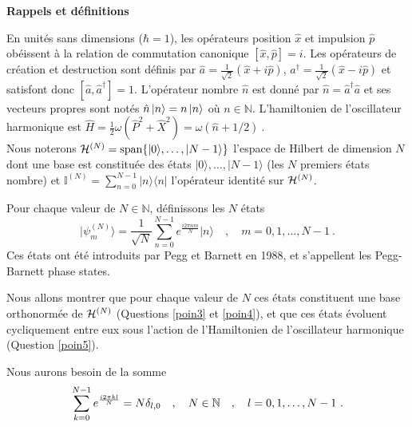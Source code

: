 {\bf Rappels et définitions}

 En unités sans dimensions ($\hbar=1$), les opérateurs position $\hat x$ et impulsion $\hat p$ obéissent à la relation de commutation canonique $[\hat x, \hat p]=i $.  Les opérateurs de création et destruction sont définis par 
$\hat a= \frac{1}{\sqrt{2}}(\hat x+i\hat p)$, $a^\dagger= \frac{1}{\sqrt{2}}(\hat x-i\hat p)$ et satisfont donc $[\hat a,\hat a^\dagger]=1$. L'opérateur nombre $\hat n$ est donné par $\hat n= \hat a^\dagger \hat a$ et ses vecteurs propres sont notés $\hat n \ket{n} =n \ket{n}$ où $n \in \mathbb{N}$. 
L'hamiltonien de l'oscillateur harmonique est $\hat H = \frac{1}{2}\omega ( \hat P^2 + \hat X^2 ) = \omega (\hat n + 1/2)\ $. \\



Nous noterons ${\cal H}^{(N)}={\text{span}}\{\lvert 0\rangle, \dotsc, \lvert N-1\rangle\}$ l'espace de Hilbert de dimension $N$ dont une base est constituée des états 
$\lvert 0\rangle, \dotsc, \lvert N-1\rangle$ (les $N$ premiers états nombre)
et $\mathbb{I}^{(N)} =\sum_{n=0}^{N-1} \lvert n \rangle \langle n \rvert$ l'opérateur identité sur ${\cal H}^{(N)}$.


Pour chaque valeur de $N\in \mathbb{N}$, définissons les $N$ états
\begin{equation}
\lvert \psi^{(N)}_m\rangle = \frac{1}{\sqrt{N}} \sum_{n=0}^{N-1} e^{\frac{i 2 \pi  nm}{N}} \lvert n \rangle\quad , \quad m=0,1,\dotsc,N-1\ .
\label{eq:states}
\end{equation}
Ces états ont été introduits par Pegg et Barnett en 1988, et s'appellent les Pegg-Barnett phase states.

Nous allons montrer que pour chaque valeur de $N$ ces états constituent une base orthonormée de ${\cal H}^{(N)}$ (Questions \ref{poin3} et \ref{poin4}), et que ces états évoluent cycliquement entre eux sous l'action de l'Hamiltonien de l'oscillateur harmonique (Question \ref{poin5}).


Nous aurons besoin de la somme 
\begin{equation}
\sum_{k=0}^{N-1} e^{\frac{i 2 \pi  k l}{N}}=N\delta_{l,0} \quad , \quad N\in \mathbb{N}  \quad , \quad  l=0,1,\dotsc,N-1\ .\\
\label{eq:sum}
\end{equation}


